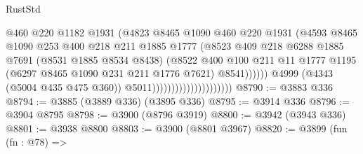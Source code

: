 \begin{lexlean}{RustStd}
\begin{coremodule}
                                                  @460
                                                  @220
                                                  @1182
                                                  @1931
                                                  (@4823
                                                    @8465
                                                    @1090
                                                    @460
                                                    @220
                                                    @1931
                                                    (@4593
                                                      @8465
                                                      @1090
                                                      @253
                                                      @400
                                                      @218
                                                      @211
                                                      @1885
                                                      @1777
                                                      (@8523
                                                        @409
                                                        @218
                                                        @6288
                                                        @1885
                                                        @7691
                                                        (@8531 @1885 @8534 @8438)
                                                        (@8522
                                                          @400
                                                          @100
                                                          @211
                                                          @11
                                                          @1777
                                                          @1195
                                                          (@6297 @8465 @1090 @231 @211 @1776 @7621)
                                                          @8541))))))
                                              @4999
                                              (@4343 (@5004 @435 @475 @360))
                                              @5011)))))))))))))))))))))
@8790 := @3883 @336
@8794 := @3885 (@3889 @336) (@3895 @336)
@8795 := @3914 @336
@8796 := @3904 @8795
@8798 := @3900 (@8796 @3919)
@8800 := @3942 (@3943 @336)
@8801 := @3938 @8800
@8803 := @3900 (@8801 @3967)
@8820 := @3899
    (fun (fn : @78) =>

\end{coremodule}
\end{lexlean}
